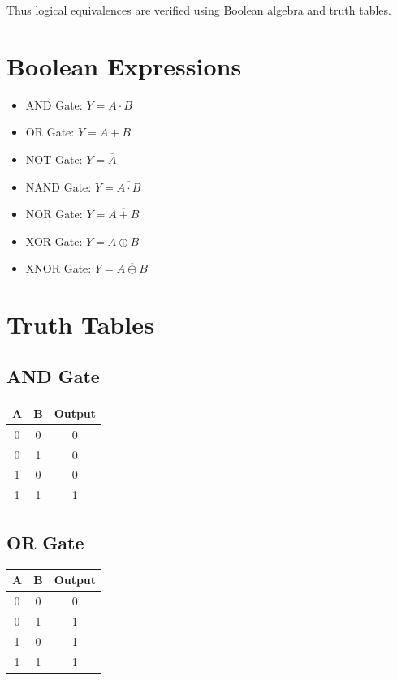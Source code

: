 \documentclass[12pt]{article}
\begin{document}
Thus logical equivalences are verified using Boolean algebra and truth tables.

\vspace{1cm}

\section*{Boolean Expressions}

\begin{itemize}
\item AND Gate: $Y = A \cdot B$
\item OR Gate: $Y = A + B$
\item NOT Gate: $Y = \overline{A}$
\item NAND Gate: $Y = \overline{A \cdot B}$
\item NOR Gate: $Y = \overline{A + B}$
\item XOR Gate: $Y = A \oplus B$
\item XNOR Gate: $Y = \overline{A \oplus B}$
\end{itemize}

\vspace{1cm}

\section*{Truth Tables}

\subsection*{AND Gate}
\begin{center}
\begin{tabular}{|c|c|c|}
\hline
A & B & Output \\
\hline
0 & 0 & 0 \\
0 & 1 & 0 \\
1 & 0 & 0 \\
1 & 1 & 1 \\
\hline
\end{tabular}
\end{center}

\subsection*{OR Gate}
\begin{center}
\begin{tabular}{|c|c|c|}
\hline
A & B & Output \\
\hline
0 & 0 & 0 \\
0 & 1 & 1 \\
1 & 0 & 1 \\
1 & 1 & 1 \\
\hline
\end{tabular}
\end{center}
\end{document}
